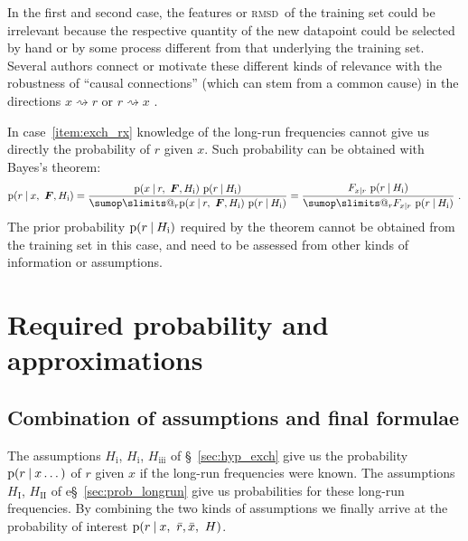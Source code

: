 \documentclass[\ifafour a4paper,12pt,\else a5paper,10pt,\fi%
onecolumn,oneside,article,%
british%
]{memoir}
\makeatletter
\theoremstyle{remark}
\theoremstyle{innote}
\def\sum{\DOTSI\sumop\slimits@}
\newcommand*{\p}{\mathrm{p}}%
\renewcommand*{\|}[1][]{\nonscript\:#1\vert\nonscript\:\mathopen{}}
\renewcommand*{\=}{\TextOrMath\texteq\eq}
\newcommand*{\sect}{\S}%
\newcommand*{\sects}{\S\S}%
\newcommand*{\cf}{{cf.}}
\newcommand*{\wrench}{{\fontencoding{U}\fontfamily{fontawesomethree}\selectfont\symbol{114}}}
\newcommand{\mynote}[1]{ {\color{notecolour}#1}}
\newcommand*{\rmsd}{\textsc{rmsd}}
\newcommand*{\ro}{r}
\newcommand*{\xo}{x}
\newcommand*{\rd}{\bar{r}}
\newcommand*{\xd}{\bar{x}}
\newcommand*{\yF}{\bm{F}}
\makeatother
\begin{document}
In the first and second case, the features or \rmsd\ of the training set
could be irrelevant because the respective quantity of the new datapoint
could be selected by hand or by some process different from that underlying
the training set. Several authors connect or motivate these different kinds
of relevance with the robustness of \enquote{causal connections} (which can
stem from a common cause) in the directions $\xo \rightsquigarrow \ro$ or
$\ro \rightsquigarrow \xo$ \parencites[\cf][\sects~2.1.2,
2.2.5]{pearl1988}.

In case~\ref{item:exch_rx} knowledge of the long-run frequencies cannot
give us directly the probability of $\ro$ given $\xo$. Such probability can
be obtained with Bayes's theorem:
\begin{equation}
  \label{eq:p_xr_bayes}
  \p(\ro \| \xo,\ \yF, H_{\textrm{i}}) =
  \frac{
    \p(\xo \| \ro,\ \yF, H_{\textrm{i}}) \ \p(\ro\| H_{\textrm{i}})
  }{
\sum_{r} \p(\xo \| r,\ \yF, H_{\textrm{i}}) \ \p(r\| H_{\textrm{i}})
} =
  \frac{ F_{\xo\mid\ro} \ \p(\ro\|  H_{\textrm{i}})
  }{ \sum_{r} F_{\xo\mid r} \ \p(r\| H_{\textrm{i}})} \ .
\end{equation}
The prior probability $\p(\ro\| H_{\textrm{i}})$ required by the theorem
cannot be obtained from the training set in this case, and need to be
assessed from other kinds of information or assumptions.


\section{Required probability and approximations}
\label{sec:p_final_inference}

\subsection{Combination of assumptions and final formulae}
\label{sec:combinations_cases_inference}

The assumptions $H_{\textrm{i}}$, $H_{\textrm{i}}$, $H_{\textrm{iii}}$ of
\sect~\ref{sec:hyp_exch} give us the probability $\p(\ro \| \xo \dotsc)$ of
$\ro$ given $\xo$ if the long-run frequencies were known. The assumptions
$H_{\textrm{I}}$, $H_{\textrm{II}}$ of e\sect~\ref{sec:prob_longrun} give
us probabilities for these long-run frequencies. By combining the two kinds
of assumptions we finally arrive at the probability of interest
$\p(\ro \| \xo,\ \rd,\xd,\ H)$.
\end{document}
